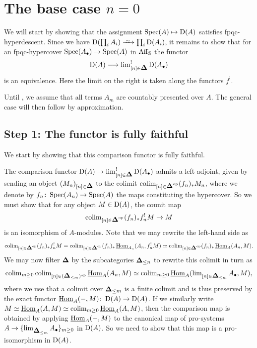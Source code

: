 \documentclass[11pt]{book}
\begin{document}
	\section{The base case \texorpdfstring{$n = 0$}{n = 0}}

	We will start by showing that the assignment $\operatorname{Spec}(A) \mapsto \operatorname{\mathrm{D}}(A)$ satisfies fpqc-hyperdescent. Since we have $\D(\prod_i A_i) \iso \prod_i \D(A_i)$, it remains to show that for an fpqc-hypercover $\operatorname{Spec}(A_{\bullet}) \to \operatorname{Spec}(A)$ in $\operatorname{Aff}_{\operatorname{\mathbb S}}$ the functor
	\[
		\D(A) \longrightarrow \lim_{[n] \in \simp}^! \D(A_{\bullet})
	\]
	is an equivalence. Here the limit on the right is taken along the functors $f^!$.

	Until , we assume that all terms $A_m$ are countably presented over $A$. The general case will then follow by approximation.

	\subsection{Step 1: The functor is fully faithful}

	We start by showing that this comparison functor is fully faithful.

	The comparison functor $\D(A) \to \lim_{[n] \in \simp}^! \D(A_{\bullet})$ admits a left adjoint, given by sending an object $(M_n)_{[n] \in \simp}$ to the colimit $\colim_{[n] \in \simp\catop} (f_n)_* M_n$, where we denote by $f_n\colon \operatorname{Spec}(A_n) \to \operatorname{Spec}(A)$ the maps constituting the hypercover. So we must show that for any object $M \in \operatorname{\mathrm{D}}(A)$, the counit map
	\[
		\colim_{[n] \in \simp\catop} (f_{n})_* f_n^! M \to M
	\]
	is an isomorphism of $A$-modules. Note that we may rewrite the left-hand side as
	\[
		\colim_{[n] \in \simp\catop} (f_{n})_* f_n^! M = \colim_{[n] \in \simp\catop} (f_{n})_* \iHom_{A_n}(A_n, f_n^! M) \simeq \colim_{[n] \in \simp\catop} (f_{n})_* \iHom_{A}(A_n, M).
	\]
	We may now filter $\simp$ by the subcategories $\simp_{\leq n}$ to rewrite this colimit in turn as
	\[
		\colim_{m \geq 0} \colim_{[n] \in (\simp_{\leq m})\catop} \iHom_A(A_n, M) \simeq \colim_{m \geq 0} \iHom_A(\lim_{[n] \in \simp_{\leq m}} A_\bullet, M),
	\]
	where we use that a colimit over $\simp_{\leq m}$ is a finite colimit and is thus preserved by the exact functor $\operatorname{\underline{\operatorname{Hom}}}_A(-, M)\colon \operatorname{\mathrm{D}}(A) \to \operatorname{\mathrm{D}}(A)$. If we similarly write $M \simeq \operatorname{\underline{\operatorname{Hom}}}_A(A, M) \simeq \operatorname{colim}_{m \geq 0} \operatorname{\underline{\operatorname{Hom}}}_A(A, M)$, then the comparison map is obtained by applying $\operatorname{\underline{\operatorname{Hom}}}_A(-, M)$ to the canonical map of pro-systems $A \to \{\lim_{\simp_{\leq m}} A_{\bullet}\}_{m \geq 0}$ in $\operatorname{\mathrm{D}}(A)$. So we need to show that this map is a pro-isomorphism in $\operatorname{\mathrm{D}}(A)$.
\end{document}
